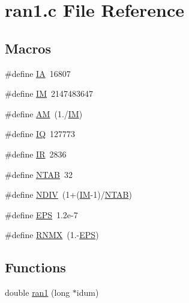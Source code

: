 \section{ran1.\-c File Reference}
\label{rng_2common_2ran1_8c}
\subsection*{Macros}
\begin{DoxyCompactItemize}
\item 
\#define \hyperlink{rng_2common_2ran1_8c_ae4b0efde4fa4613b407716d265d19b0a}{I\-A}~16807
\item 
\#define \hyperlink{rng_2common_2ran1_8c_a51c0dfe766601d31e907fceae818a7ca}{I\-M}~2147483647
\item 
\#define \hyperlink{rng_2common_2ran1_8c_ad301e6a88b1c01108f4867f2ea6f683c}{A\-M}~(1./\hyperlink{rng_2common_2ran1_8c_a51c0dfe766601d31e907fceae818a7ca}{I\-M})
\item 
\#define \hyperlink{rng_2common_2ran1_8c_ab7c5f3342853af6bb48d0ca00b05efbe}{I\-Q}~127773
\item 
\#define \hyperlink{rng_2common_2ran1_8c_a68e22635ff207d8ca10459833856bd75}{I\-R}~2836
\item 
\#define \hyperlink{rng_2common_2ran1_8c_a0e93cfb2d62849853fd34957ba6e6fdc}{N\-T\-A\-B}~32
\item 
\#define \hyperlink{rng_2common_2ran1_8c_a62339d74dd5d9d00480e1a288cf88fe8}{N\-D\-I\-V}~(1+(\hyperlink{rng_2common_2ran1_8c_a51c0dfe766601d31e907fceae818a7ca}{I\-M}-\/1)/\hyperlink{rng_2common_2ran1_8c_a0e93cfb2d62849853fd34957ba6e6fdc}{N\-T\-A\-B})
\item 
\#define \hyperlink{rng_2common_2ran1_8c_a6ebf6899d6c1c8b7b9d09be872c05aae}{E\-P\-S}~1.\-2e-\/7
\item 
\#define \hyperlink{rng_2common_2ran1_8c_aa7436c9270ffb06f8c1eae8d2e605cec}{R\-N\-M\-X}~(1.-\/\hyperlink{rng_2common_2ran1_8c_a6ebf6899d6c1c8b7b9d09be872c05aae}{E\-P\-S})
\end{DoxyCompactItemize}
\subsection*{Functions}
\begin{DoxyCompactItemize}
\item 
double \hyperlink{rng_2common_2ran1_8c_a1b3a69f1cc435a6a5dbedfa65c6796c0}{ran1} (long $\ast$idum)
\end{DoxyCompactItemize}


